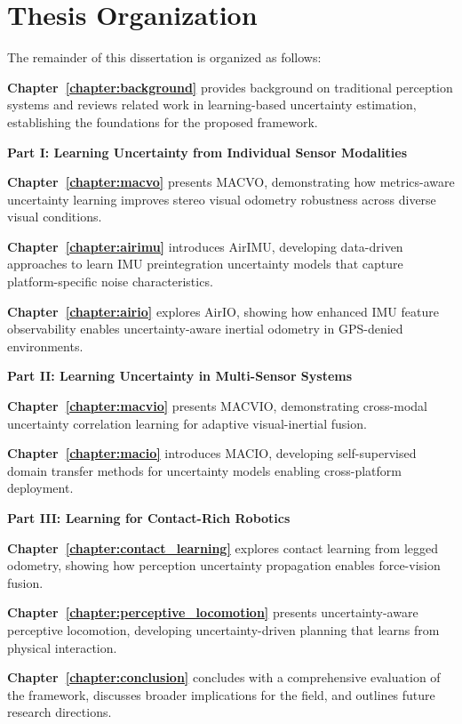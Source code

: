 \section{Thesis Organization}
\label{sec:organization}

The remainder of this dissertation is organized as follows:

\textbf{Chapter~\ref{chapter:background}} provides background on traditional perception systems and reviews related work in learning-based uncertainty estimation, establishing the foundations for the proposed framework.

\textbf{Part I: Learning Uncertainty from Individual Sensor Modalities}

\textbf{Chapter~\ref{chapter:macvo}} presents MACVO, demonstrating how metrics-aware uncertainty learning improves stereo visual odometry robustness across diverse visual conditions.

\textbf{Chapter~\ref{chapter:airimu}} introduces AirIMU, developing data-driven approaches to learn IMU preintegration uncertainty models that capture platform-specific noise characteristics.

\textbf{Chapter~\ref{chapter:airio}} explores AirIO, showing how enhanced IMU feature observability enables uncertainty-aware inertial odometry in GPS-denied environments.

\textbf{Part II: Learning Uncertainty in Multi-Sensor Systems}

\textbf{Chapter~\ref{chapter:macvio}} presents MACVIO, demonstrating cross-modal uncertainty correlation learning for adaptive visual-inertial fusion.

\textbf{Chapter~\ref{chapter:macio}} introduces MACIO, developing self-supervised domain transfer methods for uncertainty models enabling cross-platform deployment.

\textbf{Part III: Learning for Contact-Rich Robotics}

\textbf{Chapter~\ref{chapter:contact_learning}} explores contact learning from legged odometry, showing how perception uncertainty propagation enables force-vision fusion.

\textbf{Chapter~\ref{chapter:perceptive_locomotion}} presents uncertainty-aware perceptive locomotion, developing uncertainty-driven planning that learns from physical interaction.

\textbf{Chapter~\ref{chapter:conclusion}} concludes with a comprehensive evaluation of the framework, discusses broader implications for the field, and outlines future research directions.


